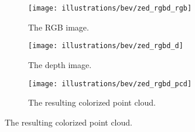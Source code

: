 \documentclass[aspectratio=169,hyperref={pdfpagelabels=false}]{beamer}
\begin{document}
    \begin{frame}
        \begin{figure}[ht!]
            \centering
            \begin{subfigure}[t]{0.32\textwidth}
                \centering
                \texttt{[image: illustrations/bev/zed\_rgbd\_rgb]}
                \caption{The RGB image.}
                \label{fig:pcd_rgbd:rgb}
            \end{subfigure}
            \hfill
            \begin{subfigure}[t]{0.32\textwidth}
                \centering
                \texttt{[image: illustrations/bev/zed\_rgbd\_d]}
                \caption{The depth image.}
                \label{fig:pcd_rgbd:depth}
            \end{subfigure}
            \hfill
            \begin{subfigure}[t]{0.32\textwidth}
                \centering
                \texttt{[image: illustrations/bev/zed\_rgbd\_pcd]}
                \caption{The resulting colorized point cloud.}
                \label{fig:pcd_rgbd:pcd}
            \end{subfigure}
        \end{figure}
    \end{frame}
\end{document}
